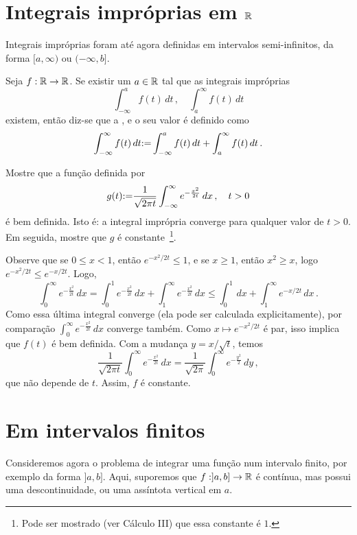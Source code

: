 \section{Integrais impróprias em $\mathbb{R}$}

Integrais impróprias foram até agora definidas em intervalos
semi-infinitos, da forma $[a,\infty)$ ou $(-\infty,b]$.

\begin{defin}
Seja $f:\mathbb{R}\to \mathbb{R}$. Se existir um $a\in \mathbb{R}$ tal que as integrais
impróprias 
$$
\int_{-\infty}^af(t)\,dt\,,\quad \int_a^\infty f(t)\,dt
$$
existem, então diz-se que a , e o seu valor é
definido como 
$$\int_{-\infty}^\infty f(t)\,dt{:=} \int_{-\infty}^a f(t)\,dt+\int_{a}^\infty f(t)\,dt\,.$$
\end{defin}

\begin{exo}
Mostre que a função definida por 
$$
g(t){:=} \frac{1}{\sqrt{2\pi t}}\int_{-\infty}^\infty
e^{-\frac{x^2}{2t}}\,dx\,,\quad t>0
$$
é bem definida. Isto é: a integral imprópria converge para
qualquer valor de $t>0$. Em seguida, mostre que $g$ é 
constante~\footnote{Pode ser mostrado (ver
Cálculo III) que essa constante é $1$.}.
\begin{sol} Observe que se $0\leq x<1$, então $e^{-x^2/2t}\leq 1$,
e se $x\geq 1$, então $x^2\geq x$, logo
$e^{-x^2/2t}\leq e^{-x/2t}$. Logo,
$$\int_{0}^\infty
e^{-\frac{x^2}{2t}}\,dx= \int_{0}^1
e^{-\frac{x^2}{2t}}\,dx+ \int_{1}^\infty
e^{-\frac{x^2}{2t}}\,dx \leq \int_0^1 \,dx+\int_1^\infty
e^{-x/2t}\,dx\,.$$
Como essa última integral converge (ela pode ser calculada
explicitamente), por comparação $\int_{0}^\infty
e^{-\frac{x^2}{2t}}\,dx$ converge também. Como $x\mapsto
e^{-x^2/2t}$ é par, isso implica que $f(t)$ é bem definida.
Com a mudança $y=x/\sqrt{t}$, temos 
$$
 \frac{1}{\sqrt{2\pi t}}\int_{0}^\infty
e^{-\frac{x^2}{2t}}\,dx= \frac{1}{\sqrt{2\pi}}\int_{0}^\infty
e^{-\frac{y^2}{2}}\,dy\,,
$$
que não depende de $t$. Assim, $f$ é constante.
\end{sol}
\end{exo}

\section{Em intervalos finitos}

Consideremos agora o problema de integrar uma função num
intervalo finito, por exemplo da forma $]a,b]$.
Aqui, suporemos que $f:]a,b]\to \mathbb{R}$ é contínua, mas possui uma descontinuidade,
ou uma assíntota vertical em $a$.

